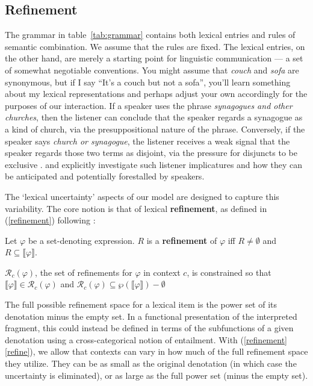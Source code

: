 \documentclass[leqno,12pt]{article}
\newcommand{\tabref}[1]{table~\ref{#1}}
\newcommand{\eg}[1]{(\ref{#1})}
\newcommand{\subeg}[2]{(\ref{#1}\ref{#2})}
\newcommand{\word}[1]{\emph{#1}}
\newcommand{\tech}[1]{\textbf{#1}}
\newcommand{\sem}[1]{\ensuremath{\llbracket#1\rrbracket}}
\newcommand{\refine}{\ensuremath{R}}
\newcommand{\Refine}[1][c]{\mathcal{R}_{#1}}
\begin{document}
{\subsection{Refinement}\label{sec:refine}

The grammar in \tabref{tab:grammar} contains both lexical entries and
rules of semantic combination. We assume that the rules are fixed.
The lexical entries, on the other hand, are merely a starting point
for linguistic communication --- a set of somewhat negotiable
conventions. You might assume that \word{couch} and \word{sofa} are
synonymous, but if I say ``It's a couch but not a sofa'', you'll learn
something about my lexical representations and perhaps adjust your own
accordingly for the purposes of our interaction.  If a speaker uses
the phrase \word{synagogues and other churches}, then the listener can
conclude that the speaker regards a synagogue as a kind of church, via
the presuppositional nature of the phrase. Conversely, if the speaker
says \word{church or synagogue}, the listener receives a weak signal
that the speaker regards those two terms as disjoint, via the pressure
for disjuncts to be exclusive
\citep{Hurford:1974}. \citet{Chemla-HurfordCounts} and
\citet{Potts:Levy:2015} explicitly investigate such listener
implicatures and how they can be anticipated and potentially
forestalled by speakers.

The `lexical uncertainty' aspects of our model are designed to capture
this variability. The core notion is that of lexical
\tech{refinement}, as defined in \eg{refinement} following \citet{Bergen:Levy:Goodman:2014}:

\begin{examples}
\item\label{refinement} 
  \begin{examples}
  \item Let $\varphi$ be a set-denoting expression. $\refine$ is a
    \tech{refinement} of $\varphi$ iff $\refine \neq \emptyset$ and
    $\refine \subseteq \sem{\varphi}$.
  \item\label{refine} $\Refine(\varphi)$, the set of refinements for
    $\varphi$ in context $c$, is constrained so that
    $\sem{\varphi} \in \Refine(\varphi)$ and
    $\Refine(\varphi) \subseteq \wp(\sem{\varphi}){-}\emptyset$
  \end{examples}
\end{examples}
%
The full possible refinement space for a lexical item is the power set
of its denotation minus the empty set. In a functional presentation of
the interpreted fragment, this could instead be defined in terms of
the subfunctions of a given denotation using a cross-categorical
notion of entailment. With \subeg{refinement}{refine}, we allow that
contexts can vary in how much of the full refinement space they
utilize. They can be as small as the original denotation (in which
case the uncertainty is eliminated), or as large as the full power set
(minus the empty set).

}
\end{document}
